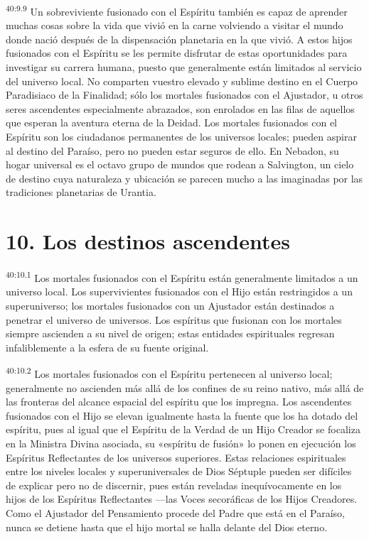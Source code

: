 \par
\textsuperscript{40:9.9} Un sobreviviente fusionado con el Espíritu también es capaz de aprender muchas cosas sobre la vida que vivió en la carne volviendo a visitar el mundo donde nació después de la dispensación planetaria en la que vivió. A estos hijos fusionados con el Espíritu se les permite disfrutar de estas oportunidades para investigar su carrera humana, puesto que generalmente están limitados al servicio del universo local. No comparten vuestro elevado y sublime destino en el Cuerpo Paradisiaco de la Finalidad; sólo los mortales fusionados con el Ajustador, u otros seres ascendentes especialmente abrazados, son enrolados en las filas de aquellos que esperan la aventura eterna de la Deidad. Los mortales fusionados con el Espíritu son los ciudadanos permanentes de los universos locales; pueden aspirar al destino del Paraíso, pero no pueden estar seguros de ello. En Nebadon, su hogar universal es el octavo grupo de mundos que rodean a Salvington, un cielo de destino cuya naturaleza y ubicación se parecen mucho a las imaginadas por las tradiciones planetarias de Urantia.

\section*{10. Los destinos ascendentes}
\par
\textsuperscript{40:10.1} Los mortales fusionados con el Espíritu están generalmente limitados a un universo local. Los supervivientes fusionados con el Hijo están restringidos a un superuniverso; los mortales fusionados con un Ajustador están destinados a penetrar el universo de universos. Los espíritus que fusionan con los mortales siempre ascienden a su nivel de origen; estas entidades espirituales regresan infaliblemente a la esfera de su fuente original.

\par
\textsuperscript{40:10.2} Los mortales fusionados con el Espíritu pertenecen al universo local; generalmente no ascienden más allá de los confines de su reino nativo, más allá de las fronteras del alcance espacial del espíritu que los impregna. Los ascendentes fusionados con el Hijo se elevan igualmente hasta la fuente que los ha dotado del espíritu, pues al igual que el Espíritu de la Verdad de un Hijo Creador se focaliza en la Ministra Divina asociada, su «espíritu de fusión» lo ponen en ejecución los Espíritus Reflectantes de los universos superiores. Estas relaciones espirituales entre los niveles locales y superuniversales de Dios Séptuple pueden ser difíciles de explicar pero no de discernir, pues están reveladas inequívocamente en los hijos de los Espíritus Reflectantes ---las Voces secoráficas de los Hijos Creadores. Como el Ajustador del Pensamiento procede del Padre que está en el Paraíso, nunca se detiene hasta que el hijo mortal se halla delante del Dios eterno.

